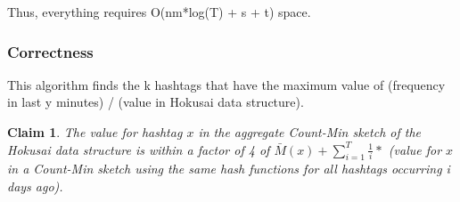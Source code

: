 \documentclass[a4paper,12pt]{article}
\newtheorem{claim}{Claim}
\begin{document}
Thus, everything requires O(nm*log(T) + s + t) space.

\subsubsection{Correctness \label{Correct}}

This algorithm finds the k hashtags that have the maximum value of (frequency in last y minutes) / (value in Hokusai data structure).

\begin{claim}
The value for hashtag $x$ in the aggregate Count-Min sketch of the Hokusai data structure is within a factor of 4 of $\bar{M}(x) + \sum\limits_{i=1}^T \frac{1}{i}*$ (value for $x$ in a Count-Min sketch using the same hash functions for all hashtags occurring i days ago).
\end{claim}
\end{document}
